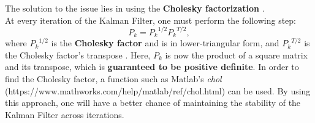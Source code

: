     The solution to the issue lies in using the \textbf{Cholesky factorization} \cite{SimonHaykinText}.
    \\
    
    At every iteration of the Kalman Filter, one must perform the following step:
    \begin{equation}
    P_k = {P_k}^{1/2} {P_k}^{T/2},
    \end{equation}
    where ${P_k}^{1/2}$ is the \textbf{Cholesky factor} and is in lower-triangular form, and ${P_k}^{T/2}$ is the Cholesky factor's transpose \cite{SimonHaykinText}. Here, $P_k$ is now the product of a square matrix and its transpose, which is \textbf{guaranteed to be positive definite}. In order to find the Cholesky factor, a function such as Matlab's \emph{chol} (https://www.mathworks.com/help/matlab/ref/chol.html) can be used. By using this approach, one will have a better chance of maintaining the stability of the Kalman Filter across iterations. \\

